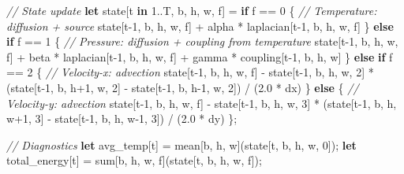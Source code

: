 \documentclass[11pt,]{article}
\newenvironment{Shaded}{}{}
\newcommand{\CommentTok}[1]{\textcolor[rgb]{0.38,0.63,0.69}{\textit{#1}}}
\newcommand{\DecValTok}[1]{\textcolor[rgb]{0.25,0.63,0.44}{#1}}
\newcommand{\KeywordTok}[1]{\textcolor[rgb]{0.00,0.44,0.13}{\textbf{#1}}}
\newcommand{\NormalTok}[1]{#1}
\newcommand{\OperatorTok}[1]{\textcolor[rgb]{0.40,0.40,0.40}{#1}}
\begin{document}
\begin{Shaded}
\begin{Highlighting}[]
\CommentTok{// State update}
\KeywordTok{let}\NormalTok{ state}\OperatorTok{[}\NormalTok{t }\KeywordTok{in} \DecValTok{1.}\NormalTok{.T, b, h, w, f}\OperatorTok{]}\NormalTok{ =}
    \KeywordTok{if}\NormalTok{ f == }\DecValTok{0} \OperatorTok{\{}
        \CommentTok{// Temperature: diffusion + source}
\NormalTok{        state}\OperatorTok{[}\NormalTok{t-}\DecValTok{1}\NormalTok{, b, h, w, f}\OperatorTok{]}\NormalTok{ + alpha * laplacian}\OperatorTok{[}\NormalTok{t-}\DecValTok{1}\NormalTok{, b, h, w, f}\OperatorTok{]}
    \OperatorTok{\}} \KeywordTok{else} \KeywordTok{if}\NormalTok{ f == }\DecValTok{1} \OperatorTok{\{}
        \CommentTok{// Pressure: diffusion + coupling from temperature}
\NormalTok{        state}\OperatorTok{[}\NormalTok{t-}\DecValTok{1}\NormalTok{, b, h, w, f}\OperatorTok{]}\NormalTok{ + beta * laplacian}\OperatorTok{[}\NormalTok{t-}\DecValTok{1}\NormalTok{, b, h, w, f}\OperatorTok{]}
\NormalTok{            + gamma * coupling}\OperatorTok{[}\NormalTok{t-}\DecValTok{1}\NormalTok{, b, h, w}\OperatorTok{]}
    \OperatorTok{\}} \KeywordTok{else} \KeywordTok{if}\NormalTok{ f == }\DecValTok{2} \OperatorTok{\{}
        \CommentTok{// Velocity-x: advection}
\NormalTok{        state}\OperatorTok{[}\NormalTok{t-}\DecValTok{1}\NormalTok{, b, h, w, f}\OperatorTok{]}\NormalTok{ -}
\NormalTok{            state}\OperatorTok{[}\NormalTok{t-}\DecValTok{1}\NormalTok{, b, h, w, }\DecValTok{2}\OperatorTok{]}\NormalTok{ *}
\NormalTok{            (state}\OperatorTok{[}\NormalTok{t-}\DecValTok{1}\NormalTok{, b, h+}\DecValTok{1}\NormalTok{, w, }\DecValTok{2}\OperatorTok{]}\NormalTok{ - state}\OperatorTok{[}\NormalTok{t-}\DecValTok{1}\NormalTok{, b, h-}\DecValTok{1}\NormalTok{, w, }\DecValTok{2}\OperatorTok{]}\NormalTok{) / (}\DecValTok{2.0}\NormalTok{ * dx)}
    \OperatorTok{\}} \KeywordTok{else} \OperatorTok{\{}
        \CommentTok{// Velocity-y: advection}
\NormalTok{        state}\OperatorTok{[}\NormalTok{t-}\DecValTok{1}\NormalTok{, b, h, w, f}\OperatorTok{]}\NormalTok{ -}
\NormalTok{            state}\OperatorTok{[}\NormalTok{t-}\DecValTok{1}\NormalTok{, b, h, w, }\DecValTok{3}\OperatorTok{]}\NormalTok{ *}
\NormalTok{            (state}\OperatorTok{[}\NormalTok{t-}\DecValTok{1}\NormalTok{, b, h, w+}\DecValTok{1}\NormalTok{, }\DecValTok{3}\OperatorTok{]}\NormalTok{ - state}\OperatorTok{[}\NormalTok{t-}\DecValTok{1}\NormalTok{, b, h, w-}\DecValTok{1}\NormalTok{, }\DecValTok{3}\OperatorTok{]}\NormalTok{) / (}\DecValTok{2.0}\NormalTok{ * dy)}
    \OperatorTok{\}}\NormalTok{;}

\CommentTok{// Diagnostics}
\KeywordTok{let}\NormalTok{ avg_temp}\OperatorTok{[}\NormalTok{t}\OperatorTok{]}\NormalTok{ = mean}\OperatorTok{[}\NormalTok{b, h, w}\OperatorTok{]}\NormalTok{(state}\OperatorTok{[}\NormalTok{t, b, h, w, }\DecValTok{0}\OperatorTok{]}\NormalTok{);}
\KeywordTok{let}\NormalTok{ total_energy}\OperatorTok{[}\NormalTok{t}\OperatorTok{]}\NormalTok{ = sum}\OperatorTok{[}\NormalTok{b, h, w, f}\OperatorTok{]}\NormalTok{(state}\OperatorTok{[}\NormalTok{t, b, h, w, f}\OperatorTok{]}\NormalTok{);}
\end{Highlighting}
\end{Shaded}
\end{document}
